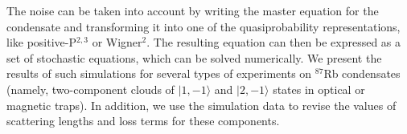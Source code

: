 \documentclass[10pt]{article}
\begin{document}
The noise can be taken into account by writing the master equation for the condensate and transforming it into one of the quasiprobability representations, like \mbox{positive-P}$^{2, 3}$ or Wigner$^2$. The resulting equation can then be expressed as a set of stochastic equations, which can be solved numerically. We present the results of such simulations for several types of experiments on $^{87}$Rb condensates (namely, two-component clouds of $\vert1,-1\rangle$ and $\vert2,-1\rangle$ states in optical or magnetic traps). In addition, we use the simulation data to revise the values of scattering lengths and loss terms for these components.



    
\end{document}
